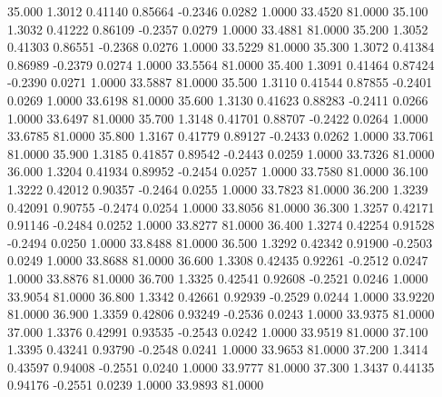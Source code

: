   35.000   1.3012   0.41140   0.85664  -0.2346   0.0282   1.0000  33.4520  81.0000
  35.100   1.3032   0.41222   0.86109  -0.2357   0.0279   1.0000  33.4881  81.0000
  35.200   1.3052   0.41303   0.86551  -0.2368   0.0276   1.0000  33.5229  81.0000
  35.300   1.3072   0.41384   0.86989  -0.2379   0.0274   1.0000  33.5564  81.0000
  35.400   1.3091   0.41464   0.87424  -0.2390   0.0271   1.0000  33.5887  81.0000
  35.500   1.3110   0.41544   0.87855  -0.2401   0.0269   1.0000  33.6198  81.0000
  35.600   1.3130   0.41623   0.88283  -0.2411   0.0266   1.0000  33.6497  81.0000
  35.700   1.3148   0.41701   0.88707  -0.2422   0.0264   1.0000  33.6785  81.0000
  35.800   1.3167   0.41779   0.89127  -0.2433   0.0262   1.0000  33.7061  81.0000
  35.900   1.3185   0.41857   0.89542  -0.2443   0.0259   1.0000  33.7326  81.0000
  36.000   1.3204   0.41934   0.89952  -0.2454   0.0257   1.0000  33.7580  81.0000
  36.100   1.3222   0.42012   0.90357  -0.2464   0.0255   1.0000  33.7823  81.0000
  36.200   1.3239   0.42091   0.90755  -0.2474   0.0254   1.0000  33.8056  81.0000
  36.300   1.3257   0.42171   0.91146  -0.2484   0.0252   1.0000  33.8277  81.0000
  36.400   1.3274   0.42254   0.91528  -0.2494   0.0250   1.0000  33.8488  81.0000
  36.500   1.3292   0.42342   0.91900  -0.2503   0.0249   1.0000  33.8688  81.0000
  36.600   1.3308   0.42435   0.92261  -0.2512   0.0247   1.0000  33.8876  81.0000
  36.700   1.3325   0.42541   0.92608  -0.2521   0.0246   1.0000  33.9054  81.0000
  36.800   1.3342   0.42661   0.92939  -0.2529   0.0244   1.0000  33.9220  81.0000
  36.900   1.3359   0.42806   0.93249  -0.2536   0.0243   1.0000  33.9375  81.0000
  37.000   1.3376   0.42991   0.93535  -0.2543   0.0242   1.0000  33.9519  81.0000
  37.100   1.3395   0.43241   0.93790  -0.2548   0.0241   1.0000  33.9653  81.0000
  37.200   1.3414   0.43597   0.94008  -0.2551   0.0240   1.0000  33.9777  81.0000
  37.300   1.3437   0.44135   0.94176  -0.2551   0.0239   1.0000  33.9893  81.0000
